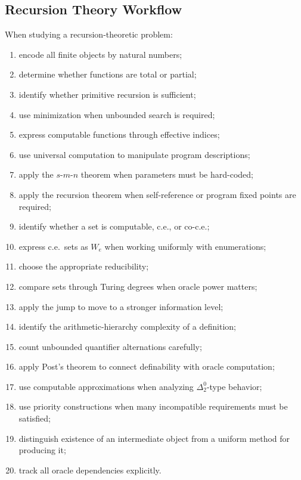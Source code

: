 \subsection{Recursion Theory Workflow}
\label{subsec:recursion-theory-workflow}

When studying a recursion-theoretic problem:

\begin{enumerate}
    \item encode all finite objects by natural numbers;
    \item determine whether functions are total or partial;
    \item identify whether primitive recursion is sufficient;
    \item use minimization when unbounded search is required;
    \item express computable functions through effective indices;
    \item use universal computation to manipulate program descriptions;
    \item apply the \(s\)-\(m\)-\(n\) theorem when parameters must be
          hard-coded;
    \item apply the recursion theorem when self-reference or program
          fixed points are required;
    \item identify whether a set is computable, c.e., or co-c.e.;
    \item express c.e.\ sets as \(W_e\) when working uniformly with
          enumerations;
    \item choose the appropriate reducibility;
    \item compare sets through Turing degrees when oracle power matters;
    \item apply the jump to move to a stronger information level;
    \item identify the arithmetic-hierarchy complexity of a definition;
    \item count unbounded quantifier alternations carefully;
    \item apply Post's theorem to connect definability with oracle
          computation;
    \item use computable approximations when analyzing
          \(\Delta^0_2\)-type behavior;
    \item use priority constructions when many incompatible requirements
          must be satisfied;
    \item distinguish existence of an intermediate object from a uniform
          method for producing it;
    \item track all oracle dependencies explicitly.
\end{enumerate}

